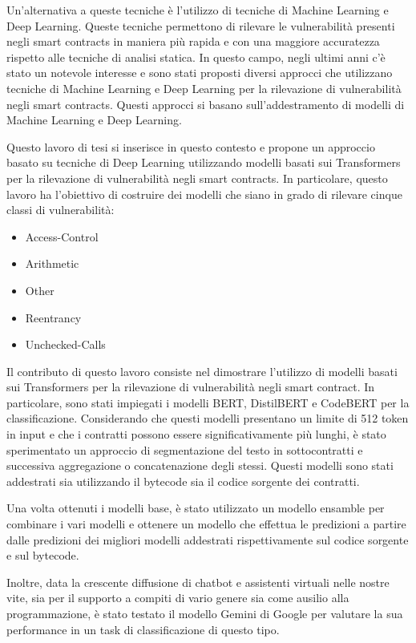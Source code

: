 \documentclass[../../Thesis.tex]{subfiles}
\begin{document}
Un'alternativa a queste tecniche è l'utilizzo di tecniche di Machine Learning e Deep Learning. Queste tecniche permettono di rilevare le vulnerabilità presenti negli smart contracts in maniera più rapida e con una maggiore accuratezza rispetto alle tecniche di analisi statica. In questo campo, negli ultimi anni c'è stato un notevole interesse e sono stati proposti diversi approcci che utilizzano tecniche di Machine Learning e Deep Learning per la rilevazione di vulnerabilità negli smart contracts. Questi approcci si basano sull'addestramento di modelli di Machine Learning e Deep Learning. 

Questo lavoro di tesi si inserisce in questo contesto e propone un approccio basato su tecniche di Deep Learning utilizzando modelli basati sui Transformers per la rilevazione di vulnerabilità negli smart contracts. In particolare, questo lavoro ha l'obiettivo di costruire dei modelli che siano in grado di rilevare cinque classi di vulnerabilità:
\begin{itemize}
    \item Access-Control
    \item Arithmetic
    \item Other
    \item Reentrancy
    \item Unchecked-Calls
\end{itemize}
 
Il contributo di questo lavoro consiste nel dimostrare l'utilizzo di modelli basati sui Transformers per la rilevazione di vulnerabilità negli smart contract. In particolare, sono stati impiegati i modelli BERT, DistilBERT e CodeBERT per la classificazione. Considerando che questi modelli presentano un limite di 512 token in input e che i contratti possono essere significativamente più lunghi, è stato sperimentato un approccio di segmentazione del testo in sottocontratti e successiva aggregazione o concatenazione degli stessi. Questi modelli sono stati addestrati sia utilizzando il bytecode sia il codice sorgente dei contratti. 

Una volta ottenuti i modelli base, è stato utilizzato un modello ensamble per combinare i vari modelli e ottenere un modello che effettua le predizioni a partire dalle predizioni dei migliori modelli addestrati rispettivamente sul codice sorgente e sul bytecode. 

Inoltre, data la crescente diffusione di chatbot e assistenti virtuali nelle nostre vite, sia per il supporto a compiti di vario genere sia come ausilio alla programmazione, è stato testato il modello Gemini di Google per valutare la sua performance in un task di classificazione di questo tipo. 
\end{document}
